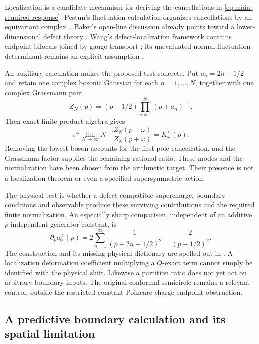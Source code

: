 Localization is a candidate mechanism for deriving the
cancellations in \eqref{eq:main-required-response}. Pestun's
fluctuation calculation organizes cancellations by an
equivariant complex~\cite{Pestun}. Baker's open-line discussion
already points toward a lower-dimensional defect theory
\cite[Section~3.3]{Baker}. Wang's defect-localization framework
contains endpoint bilocals joined by gauge transport
\cite[Section~5.1, equation~(5.5)]{WangDefects}; its unevaluated
normal-fluctuation determinant remains an explicit assumption
\cite[Section~4.4]{WangDefects}.

An auxiliary calculation makes the proposed test concrete. Put
$a_n=2n+1/2$ and retain one complex bosonic Gaussian for each
$n=1,\ldots,N$, together with one complex Grassmann pair:
\begin{equation}\label{eq:main-bf-product}
 Z_N(p)=(p-1/2)\prod_{n=1}^N(p+a_n)^{-1}.
\end{equation}
Then exact finite-product algebra gives
\begin{equation}\label{eq:main-bf-ratio}
 \pi^\omega\lim_{N\to\infty}N^{-\omega}
 \frac{Z_N(p-\omega)}{Z_N(p+\omega)}
 =K_\omega^{<}(p).
\end{equation}
Removing the lowest boson accounts for the first pole
cancellation, and the Grassmann factor supplies the remaining
rational ratio. These modes and the normalization have been
chosen from the arithmetic target. Their presence is not a
localization theorem or even a specified supersymmetric action.

The physical test is whether a defect-compatible supercharge,
boundary conditions and observable produce these surviving
contributions and the required finite normalization.
An especially sharp comparison, independent of an additive
$p$-independent generator constant, is
\begin{equation}\label{eq:main-mode-test}
 \partial_p a_0^{<}(p)
 =2\sum_{n=1}^{\infty}\frac1{(p+2n+1/2)^2}
  -\frac2{(p-1/2)^2}.
\end{equation}
The construction and its missing physical dictionary are
spelled out in \cite[Section~S11]{Supplement}. A localization
deformation coefficient multiplying a $Q$-exact term cannot
simply be identified with the physical shift. Likewise a
partition ratio does not yet act on arbitrary boundary inputs.
The original conformal semicircle remains a relevant control,
outside the restricted constant-Poincare-charge endpoint
obstruction.

\subsection{A predictive boundary calculation and its spatial limitation}
\label{subsec:main-localized-control}

